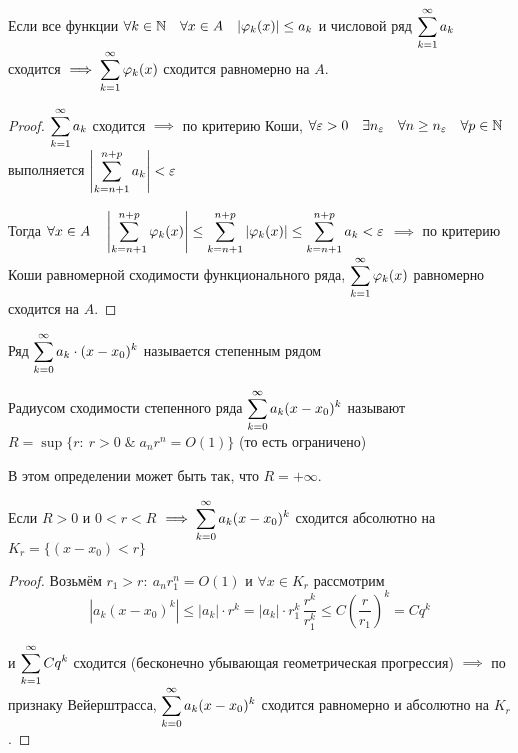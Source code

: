 \begin{theorem}
    Если все функции 
    $\forall k \in \mathbb{N} \quad \forall x \in A \quad |\varphi_k(x)| \leq a_k$ 
    и числовой ряд $\displaystyle\sum_{k=1}^\infty a_k$ сходится $\implies \displaystyle\sum_{k=1}^\infty \varphi_k(x)$
    сходится равномерно на $A$.
\end{theorem}
\begin{proof}
    $\displaystyle\sum_{k=1}^\infty a_k$ сходится $\implies$ по критерию Коши, $\forall \varepsilon > 0
    \quad \exists n_\varepsilon \quad \forall n \geq n_\varepsilon \quad
    \forall p \in \mathbb{N}$ выполняется $\left| \displaystyle\sum_{k=n+1}^{n+p} a_k \right| < \varepsilon$

    Тогда $\forall x \in A \quad \left| \displaystyle\sum_{k=n+1}^{n+p} \varphi_k(x) \right|
    \leq \displaystyle\sum_{k=n+1}^{n+p} |\varphi_k(x)|
    \leq \displaystyle\sum_{k=n+1}^{n+p} a_k < \varepsilon$
    $\implies$ по критерию Коши равномерной сходимости функционального ряда,
    $\displaystyle\sum_{k=1}^\infty \varphi_k(x)$ равномерно сходится на $A$.
\end{proof}

\begin{definition}
    Ряд $\displaystyle\sum_{k=0}^\infty a_k \cdot (x - x_0)^k$ называется степенным рядом
\end{definition}

\begin{definition}
    Радиусом сходимости степенного ряда $\displaystyle\sum_{k=0}^\infty a_k (x - x_0)^k$ называют
    $R = \sup \{ r: \: r > 0 \; \& \; a_n r^n = O(1) \}$ (то есть ограничено)

    В этом определении может быть так, что $R = +\infty$.
\end{definition}

\begin{theorem}
    Если $R > 0$ и $0 < r < R$ $\implies \displaystyle\sum_{k=0}^\infty a_k (x - x_0)^k$ сходится
    абсолютно на $K_r = \{ (x - x_0) < r \}$
\end{theorem}
\begin{proof}
    Возьмём $r_1 > r: \: a_n r_1^n = O(1)$ и $\forall x \in K_r$ рассмотрим
    \[ 
        |a_k (x - x_0)^k| \leq |a_k| \cdot r^k
        = |a_k| \cdot r_1^k \, \frac{r^k}{r_1^k}
        \leq C \left( \frac{r}{r_1} \right)^k = C q^k
    \]

     и $\displaystyle\sum_{k=1}^\infty C q^k$ сходится (бесконечно убывающая геометрическая прогрессия)
    $\implies$ по признаку Вейерштрасса, $\displaystyle\sum_{k=0}^\infty a_k (x - x_0)^k$ сходится
    равномерно и абсолютно на $K_r$.
\end{proof}

